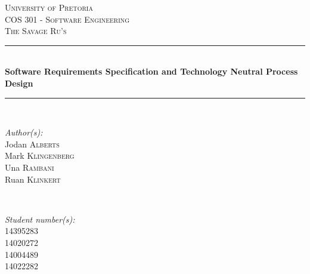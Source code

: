 \documentclass[a4paper,12pt]{article}
\begin{document}
\begin{titlepage}

\newcommand{\HRule}{\rule{\linewidth}{0.5mm}} %

\center %
 

\textsc{\LARGE University of Pretoria}\\[1.5cm]
\textsc{\Large COS 301 - Software Engineering}\\[0.5cm]
\textsc{\large The Savage Ru's}\\[0.5cm]


\HRule \\[0.4cm]
{ \huge \bfseries Software Requirements Specification and Technology Neutral Process Design}\\[0.4cm] %
\HRule \\[1.5cm]
 

\begin{minipage}{0.4\textwidth}
\begin{flushleft} \large
\emph{Author(s):}\\
Jodan \textsc{Alberts}\\ %
Mark \textsc{Klingenberg}\\
Una \textsc{Rambani}\\
Ruan \textsc{Klinkert}\\
\end{flushleft}
\end{minipage}
~
\begin{minipage}{0.4\textwidth}
\begin{flushright} \large
\emph{Student number(s):} \\
14395283\\ %
14020272\\
14004489\\
14022282\\


\end{flushright}
\end{minipage}
\end{titlepage}
\end{document}
